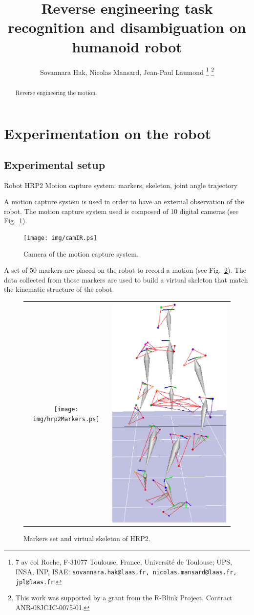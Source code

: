 \documentclass[letterpaper, 10pt, conference]{ieeeconf}      %
\title{\LARGE \bf
Reverse engineering task recognition and disambiguation on humanoid robot
}
\author{Sovannara Hak, Nicolas Mansard, Jean-Paul Laumond%
  \thanks{7 av col Roche, F-31077 Toulouse, France, Universit\'e de Toulouse; UPS, INSA, INP,
    ISAE: {\tt\small sovannara.hak@laas.fr, nicolas.mansard@laas.fr, jpl@laas.fr}.}
  \thanks{This work was supported by a grant from the R-Blink Project, Contract
    ANR-08JCJC-0075-01.}  }
\begin{document}
\maketitle
\thispagestyle{empty}
\pagestyle{empty}


\begin{abstract}
Reverse engineering the motion.
\end{abstract}

\section{Experimentation on the robot}

\subsection{Experimental setup}
Robot HRP2
Motion capture system: markers, skeleton, joint angle trajectory

A motion capture system is used in order to have an external observation of the robot.
The motion capture system used is composed of 10 digital cameras (see Fig.~\ref{fig:camera}). 
\begin{figure}[t]
\centering
\texttt{[image: img/camIR.ps]} 
\caption{Camera of the motion capture system.}
\label{fig:camera}
\end{figure}

A set of 50 markers
are placed on the robot to record a motion (see Fig.~\ref{fig:hrp2Markers}). The data collected from those markers
are used to build a virtual skeleton that match the kinematic structure of the robot.
\begin{figure}[t]
\centering
\begin{tabular}{cc}
\texttt{[image: img/hrp2Markers.ps]} &
\includegraphics[height=0.7\linewidth]{img/skel.ps} \\
\end{tabular}
\caption{Markers set and virtual skeleton of HRP2.}
\label{fig:hrp2Markers}
\end{figure}
\end{document}
